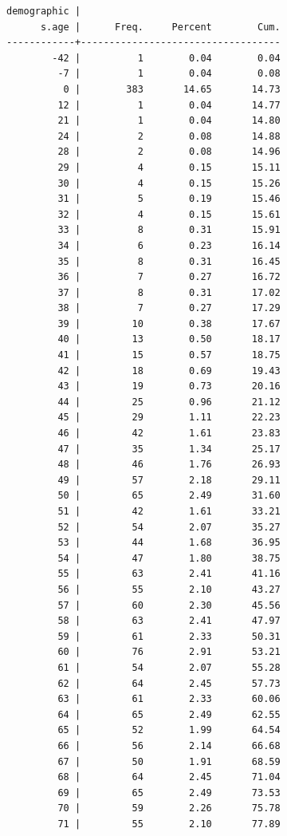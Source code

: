 \documentclass[
]{book}
\begin{document}
\begin{verbatim}
demographic |
      s.age |      Freq.     Percent        Cum.
------------+-----------------------------------
        -42 |          1        0.04        0.04
         -7 |          1        0.04        0.08
          0 |        383       14.65       14.73
         12 |          1        0.04       14.77
         21 |          1        0.04       14.80
         24 |          2        0.08       14.88
         28 |          2        0.08       14.96
         29 |          4        0.15       15.11
         30 |          4        0.15       15.26
         31 |          5        0.19       15.46
         32 |          4        0.15       15.61
         33 |          8        0.31       15.91
         34 |          6        0.23       16.14
         35 |          8        0.31       16.45
         36 |          7        0.27       16.72
         37 |          8        0.31       17.02
         38 |          7        0.27       17.29
         39 |         10        0.38       17.67
         40 |         13        0.50       18.17
         41 |         15        0.57       18.75
         42 |         18        0.69       19.43
         43 |         19        0.73       20.16
         44 |         25        0.96       21.12
         45 |         29        1.11       22.23
         46 |         42        1.61       23.83
         47 |         35        1.34       25.17
         48 |         46        1.76       26.93
         49 |         57        2.18       29.11
         50 |         65        2.49       31.60
         51 |         42        1.61       33.21
         52 |         54        2.07       35.27
         53 |         44        1.68       36.95
         54 |         47        1.80       38.75
         55 |         63        2.41       41.16
         56 |         55        2.10       43.27
         57 |         60        2.30       45.56
         58 |         63        2.41       47.97
         59 |         61        2.33       50.31
         60 |         76        2.91       53.21
         61 |         54        2.07       55.28
         62 |         64        2.45       57.73
         63 |         61        2.33       60.06
         64 |         65        2.49       62.55
         65 |         52        1.99       64.54
         66 |         56        2.14       66.68
         67 |         50        1.91       68.59
         68 |         64        2.45       71.04
         69 |         65        2.49       73.53
         70 |         59        2.26       75.78
         71 |         55        2.10       77.89

\end{verbatim}
\end{document}
